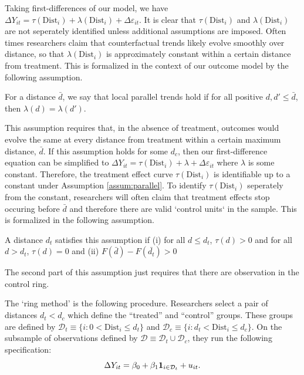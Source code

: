 \documentclass[10pt]{article}
\newcommand{\dist}{\text{Dist}}
\begin{document}
Taking first-differences of our model, we have $\Delta Y_{it} = \tau(\dist_i) + \lambda(\dist_i) + \Delta \varepsilon_{it}$. It is clear that $\tau(\dist_i)$ and $\lambda(\dist_i)$ are not seperately identified unless additional assumptions are imposed. Often times researchers claim that counterfactual trends likely evolve smoothly over distance, so that $\lambda(\dist_i)$ is approximately constant within a certain distance from treatment. This is formalized in the context of our outcome model by the following assumption. 

\begin{assumption}\label{assum:parallel}
    For a distance $\bar{d}$, we say that local parallel trends hold if for all positive $d, d' \leq \bar{d}$, then $\lambda(d) = \lambda(d')$.
\end{assumption}

This assumption requires that, in the absence of treatment, outcomes would evolve the same at every distance from treatment within a certain maximum distance, $\bar{d}$. If this assumption holds for some $d_c$, then our first-difference equation can be simplified to $\Delta Y_{it} = \tau(\dist_i) + \lambda + \Delta \varepsilon_{it}$ where $\lambda$ is some constant. Therefore, the treatment effect curve $\tau(\dist_i)$ is identifiable up to a constant under Assumption \ref{assum:parallel}. To identify $\tau(\dist_i)$ seperately from the constant, researchers will often claim that treatment effects stop occuring before $\bar{d}$ and therefore there are valid `control units` in the sample. This is formalized in the following assumption. 

\begin{assumption}[Correct $d_t$]\label{assum:dt}
    A distance $d_t$ satisfies this assumption if (i) for all $d \leq d_t$, $\tau(d) > 0$ and for all $d > d_t$, $\tau(d) = 0$ and (ii) $F(\bar{d}) - F(\bar{d_t}) > 0$
\end{assumption}


The second part of this assumption just requires that there are observation in the control ring.

The `ring method' is the following procedure. Researchers select a pair of distances $d_t < d_c$ which define the ``treated'' and ``control'' groups. These groups are defined by $\mathcal{D}_t \equiv \{ i : 0 < \dist_i \leq d_t \}$ and $\mathcal{D}_c \equiv \{ i : d_t < \dist_i \leq d_c \}$. On the subsample of observations defined by $\mathcal{D} \equiv \mathcal{D}_t \cup \mathcal{D}_c$, they run the following specification:
\begin{equation}\label{eq:ring_method}
    \Delta Y_{it} = \beta_0 + \beta_1 \mathbf{1}_{i \in \mathcal{D}_t} + u_{it}.
\end{equation}
\end{document}
